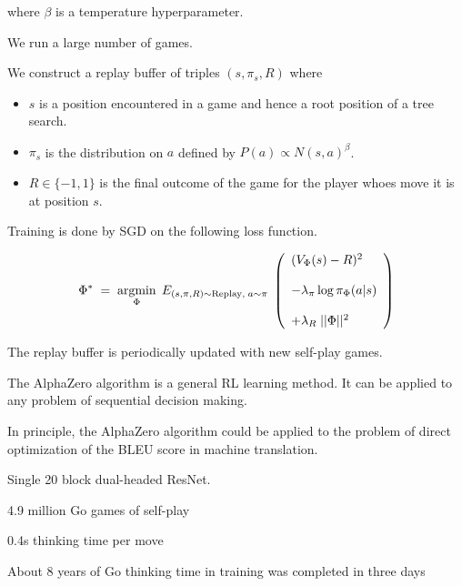{\vfill
where $\beta$ is a temperature hyperparameter.


We run a large number of games.

\vfill
We construct a replay buffer of triples $(s,\pi_{s},R)$ where

\vfill
\begin{itemize}
\item $s$ is a position encountered in a game and hence a root position of a tree search.

\vfill
\item $\pi_{s}$ is the distribution on $a$ defined by $P(a) \propto N(s,a)^\beta$.

\vfill
\item $R \in \{-1,1\}$ is the final outcome of the game for the player whoes move it is at position $s$.
\end{itemize}


\vfill
Training is done by SGD on the following loss function.

$$\Phi^*\; = \;\operatorname*{argmin}_\Phi \;E_{(s,\pi,R) \sim \mathrm{Replay},\;a \sim \pi}\;\left(\begin{array}{l} (V_\Phi(s) - R)^2 \\ \\ - \lambda_\pi\log \pi_\Phi(a|s) \\ \\ + \lambda_R\;||\Phi||^2\end{array}\right)$$

\vfill
The replay buffer is periodically updated with new self-play games.


The AlphaZero algorithm is a general RL learning method.  It can be applied to any problem of sequential decision making.

\vfill
In principle, the AlphaZero algorithm could be applied to the problem of direct optimization of the BLEU score in machine translation.



Single 20 block dual-headed ResNet.

\vfill
4.9 million Go games of self-play

\vfill
0.4s thinking time per move

\vfill
About 8 years of Go thinking time in training was completed in three days

}

